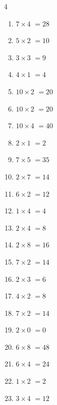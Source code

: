 \begin{multicols}{4}
\begin{enumerate}
  \item $7\times 4$
        $=28$

  \item $5\times 2$
        $=10$

  \item $3\times 3$
        $=9$

  \item $4\times 1$
        $=4$

  \item $10\times 2$
        $=20$

  \item $10\times 2$
        $=20$

  \item $10\times 4$
        $=40$

  \item $2\times 1$
        $=2$

  \item $7\times 5$
        $=35$

  \item $2\times 7$
        $=14$

  \item $6\times 2$
        $=12$

  \item $1\times 4$
        $=4$

  \item $2\times 4$
        $=8$

  \item $2\times 8$
        $=16$

  \item $7\times 2$
        $=14$

  \item $2\times 3$
        $=6$

  \item $4\times 2$
        $=8$

  \item $7\times 2$
        $=14$

  \item $2\times 0$
        $=0$

  \item $6\times 8$
        $=48$

  \item $6\times 4$
        $=24$

  \item $1\times 2$
        $=2$

  \item $3\times 4$
        $=12$


\end{enumerate}
\end{multicols}
